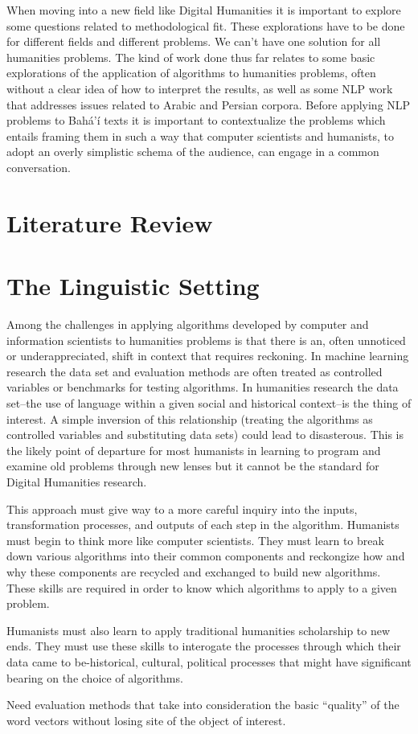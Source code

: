 \documentclass[12pt, oneside]{report}
\begin{document}
When moving into a new field like Digital Humanities it is important to explore some questions related to methodological fit. These explorations have to be done for different fields and different problems. We can't have one solution for all humanities problems. The kind of work done thus far relates to some basic explorations of the application of algorithms to humanities problems, often without a clear idea of how to interpret the results, as well as some NLP work that addresses issues related to Arabic and Persian corpora. Before applying NLP problems to Bahá'í texts it is important to contextualize the problems which entails framing them in such a way that computer scientists and humanists, to adopt an overly simplistic schema of the audience, can engage in a common conversation.
\chapter{Literature Review}

\chapter{The Linguistic Setting}
\par
Among the challenges in applying algorithms developed by computer and information scientists to humanities problems is that there is an, often unnoticed or underappreciated, shift in context that requires reckoning. In machine learning research the data set and evaluation methods are often treated as controlled variables or benchmarks for testing algorithms. In humanities research the data set–the use of language within a given social and historical context–is the thing of interest. A simple inversion of this relationship (treating the algorithms as controlled variables and substituting data sets) could lead to disasterous. This is the likely point of departure for most humanists in learning to program and examine old problems through new lenses but it cannot be the standard for Digital Humanities research.
\par
This approach must give way to a more careful inquiry into the inputs, transformation processes, and outputs of each step in the algorithm. Humanists must begin to think more like computer scientists. They must learn to break down various algorithms into their common components and reckongize how and why these components are recycled and exchanged to build new algorithms. These skills are required in order to know which algorithms to apply to a given problem.
\par
Humanists must also learn to apply traditional humanities scholarship to new ends. They must use these skills to interogate the processes through which their data came to be-historical, cultural, political processes that might have significant bearing on the choice of algorithms.
\par
Need evaluation methods that take into consideration the basic “quality” of the word vectors without losing site of the object of interest.
\end{document}
